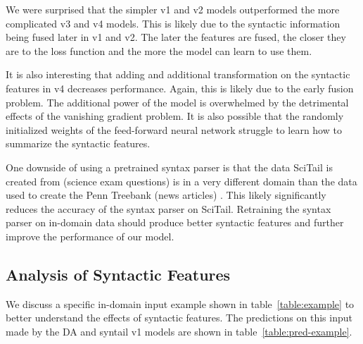 \documentclass[11pt,a4paper]{article}
\begin{document}
We were surprised that the simpler v1 and v2 models outperformed the more
complicated v3 and v4 models. This is likely due to the syntactic information
being fused later in v1 and v2. The later the features are fused, the closer
they are to the loss function and the more the model can learn to use them.

It is also interesting that adding and additional transformation on the
syntactic features in v4 decreases performance.  Again, this is likely due to
the early fusion problem.  The additional power of the model is overwhelmed by
the detrimental effects of the vanishing gradient problem.  It is also possible
that the randomly initialized weights of the feed-forward neural network
struggle to learn how to summarize the syntactic features.

One downside of using a pretrained syntax parser is that the data SciTail is
created from (science exam questions) is in a very different domain than the
data used to create the Penn Treebank (news articles)
\citep{marcus1993building}.  This likely significantly reduces the accuracy of
the syntax parser on SciTail. Retraining the syntax parser on in-domain data
should produce better syntactic features and further improve the performance of
our model.

\subsection{Analysis of Syntactic Features}

We discuss a specific in-domain input example shown in
table~\ref{table:example} to better understand the effects of syntactic
features. The predictions on this input made by the DA and syntail v1 models
are shown in table~\ref{table:pred-example}.

\begin{table}[t]
  \centering
  \caption{A pair of sentences where syntail performs particularly well. The
      hypothesis is entailed by the premise.}
\label{table:example}
\end{table}
\end{document}
